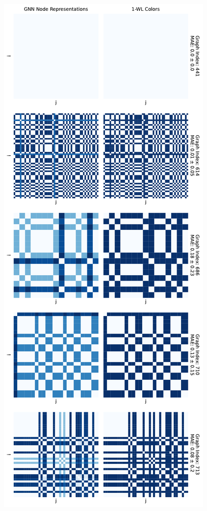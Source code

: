 \begin{figure}[!ht]
    \centering
    \begin{minipage}[b]{0.45992852703\textwidth}
        \centering
        \includegraphics[width=\textwidth, left]{Figures/heatmaps_IMDB-BINARY_0.pdf}

\end{minipage}
\end{figure}
